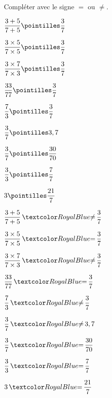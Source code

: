 \begin{Maquette}[Fiche,CorrigeFin,Colonnes=2]{}
\begin{multicols}{2}
      \begin{exercice}[SLF] %
         Compléter avec le signe $=$ ou $\neq$. \medskip
         \begin{colenumerate}[3]
            \item $\dfrac{3+5}{7+5} \pointilles \dfrac{3}{7}$ \bigskip
            \item $\dfrac{3\times5}{7\times5} \pointilles \dfrac{3}{7}$ \bigskip
            \item $\dfrac{3\times7}{7\times3} \pointilles \dfrac{3}{7}$ \medskip
            \item $\dfrac{33}{77} \pointilles \dfrac{3}{7}$
            \item $\dfrac{7}{3} \pointilles \dfrac{3}{7}$
            \item $\dfrac{3}{7} \pointilles 3,7$
            \item $\dfrac{3}{7} \pointilles \dfrac{30}{70}$
            \item $\dfrac{3}{3} \pointilles \dfrac{7}{7}$
            \item $3 \pointilles \dfrac{21}{7}$
         \end{colenumerate}
      \end{exercice}
      
      \begin{Solution}
            \begin{colenumerate}[3]
            \item $\dfrac{3+5}{7+5} \, \cor{\neq} \, \dfrac{3}{7}$ \medskip
            \item $\dfrac{3\times5}{7\times5} \, \cor{=} \, \dfrac{3}{7}$ \medskip
            \item $\dfrac{3\times7}{7\times3} \, \cor{\neq} \, \dfrac{3}{7}$
            \item $\dfrac{33}{77} \, \cor{=} \,  \dfrac{3}{7}$
            \item $\dfrac{7}{3} \, \cor{\neq} \, \dfrac{3}{7}$
            \item $\dfrac{3}{7} \, \cor{\neq} \, 3,7$
            \item $\dfrac{3}{7} \, \cor{=} \, \dfrac{30}{70}$
            \item $\dfrac{3}{3} \, \cor{=} \, \dfrac{7}{7}$
            \item $3 \, \cor{=} \, \dfrac{21}{7}$
         \end{colenumerate}
      \end{Solution}
      


\end{multicols}
\end{Maquette}
